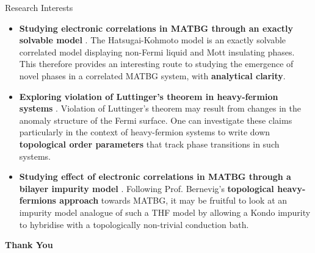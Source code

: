 \documentclass[10pt,aspectratio=169]{beamer}
\newcommand\focus[1]{%
	{\alert{\textbf{#1}}}
}
\begin{document}
\begin{frame}{Research Interests}
	\begin{itemize}
		\item  \focus{Studying electronic correlations in MATBG through an exactly solvable model}. The Hatsugai-Kohmoto model is an exactly solvable correlated model displaying non-Fermi liquid and Mott insulating phases. This therefore provides an interesting route to studying the emergence of novel phases in a correlated MATBG system, with {\bf analytical clarity}.\\[20pt]
		\item \focus{Exploring violation of Luttinger's theorem in heavy-fermion systems}. Violation of Luttinger's theorem may result from changes in the anomaly structure of the Fermi surface. One can investigate these claims particularly in the context of heavy-fermion systems to write down {\bf topological order parameters} that track phase transitions in such systems.\\[20pt]
		\item \focus{Studying effect of electronic correlations in MATBG through a bilayer impurity model}. Following Prof. Bernevig's {\bf topological heavy-fermions approach} towards MATBG, it may be fruitful to look at an impurity model analogue of such a THF model by allowing a Kondo impurity to hybridise with a topologically non-trivial conduction bath.
	\end{itemize}
\end{frame}

\begin{frame}{}
	\vfill
	\centering
\focus{\Large Thank You}
	\vfill
\end{frame}
\end{document}
